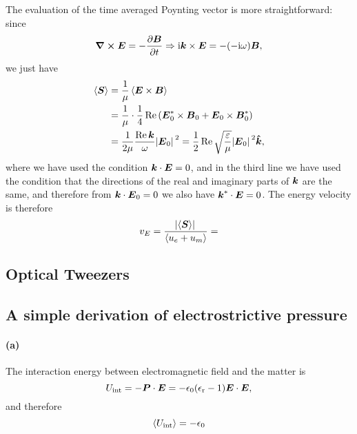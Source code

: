 \documentclass[hyperref, a4paper]{article}
\newcommand*{\ii}{\mathrm{i}}
\newcommand{\epsr}{\epsilon_{\text{r}}}
\begin{document}
The evaluation of the time averaged Poynting vector is more straightforward:
since 
\begin{equation}
    \curl{\vb*{E}} = - \pdv{\vb*{B}}{t} \Rightarrow
    \ii \vb*{k} \times \vb*{E} = - (- \ii \omega) \vb*{B},
\end{equation}
we just have 
\begin{equation}
    \begin{aligned}
        \expval{\vb*{S}} &= \frac{1}{\mu} \expval{\vb*{E} \times \vb*{B}} \\
        &= \frac{1}{\mu} \cdot \frac{1}{4} \Re \left(
            \vb*{E}^*_0 \times \vb*{B}_0 + \vb*{E}_0 \times \vb*{B}^*_0 
        \right) \\
        &= \frac{1}{2 \mu} \frac{\Re \vb*{k}}{\omega} \abs*{\vb*{E}_0}^2
        = \frac{1}{2} \Re \sqrt{\frac{\varepsilon}{\mu}} \abs*{\vb*{E}_0}^2 \vu*{k} ,
    \end{aligned}
\end{equation}
where we have used the condition $\vb*{k} \cdot \vb*{E} = 0$,
and in the third line we have used the condition that 
the directions of the real and imaginary parts of $\vb*{k}$
are the same, and therefore 
from $\vb*{k} \cdot \vb*{E}_0 = 0$ we also have 
$\vb*{k}^* \cdot \vb*{E} = 0$.
The energy velocity is therefore 
\begin{equation}
    v_{E} = \frac{\abs*{\expval{\vb*{S}}}}{\expval{u_e + u_m}}
    = 
\end{equation}

\subsection{Optical Tweezers}

\subsubsection{}

\subsection{A simple derivation of electrostrictive pressure}

\paragraph{(a)}
The interaction energy between electromagnetic field and the matter is 
\begin{equation}
    U_{\text{int}} = - \vb*{P} \cdot \vb*{E}
    = - \epsilon_0 (\epsr - 1) \vb*{E} \cdot \vb*{E},
\end{equation}
and therefore 
\begin{equation}
    \expval{U_{\text{int}}} = - \epsilon_0 
\end{equation}
\end{document}
